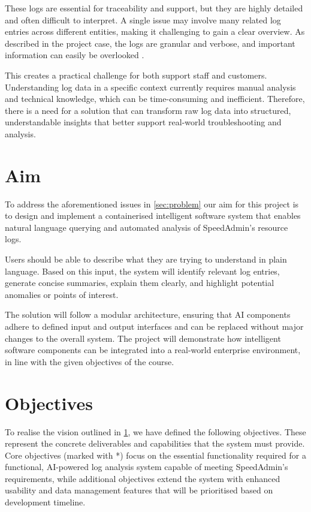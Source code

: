 \documentclass[12pt, a4paper]{article}
\begin{document}
These logs are essential for traceability and support, but they are highly detailed and often difficult to interpret. A single issue may involve many related log entries across different entities, making it challenging to gain a clear overview. As described in the project case, the logs are granular and verbose, and important information can easily be overlooked \cite{Kumar2026}.

This creates a practical challenge for both support staff and customers. Understanding log data in a specific context currently requires manual analysis and technical knowledge, which can be time-consuming and inefficient. Therefore, there is a need for a solution that can transform raw log data into structured, understandable insights that better support real-world troubleshooting and analysis.


\section{Aim} \label{sec:aim}
To address the aforementioned issues in \cref{sec:problem} our aim for this project is to design and implement a containerised intelligent software system that enables natural language querying and automated analysis of SpeedAdmin's resource logs.

Users should be able to describe what they are trying to understand in plain language. Based on this input, the system will identify relevant log entries, generate concise summaries, explain them clearly, and highlight potential anomalies or points of interest.

The solution will follow a modular architecture, ensuring that AI components adhere to defined input and output interfaces and can be replaced without major changes to the overall system. The project will demonstrate how intelligent software components can be integrated into a real-world enterprise environment, in line with the given objectives of the course.

\section{Objectives}

To realise the vision outlined in \cref{sec:aim}, we have defined the following objectives. These represent the concrete deliverables and capabilities that the system must provide. Core objectives (marked with *) focus on the essential functionality required for a functional, AI-powered log analysis system capable of meeting SpeedAdmin's requirements, while additional objectives extend the system with enhanced usability and data management features that will be prioritised based on development timeline.
\end{document}

